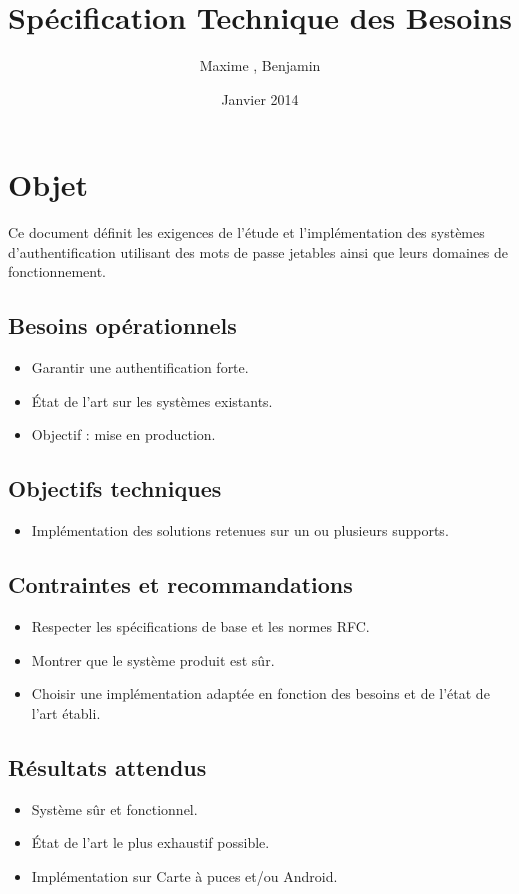 \documentclass{"../../res/univ-projet"}
\title{Spécification Technique des Besoins}
\author{Maxime \bsc{Michotte}, Benjamin \bsc{Zigh}}
\date{Janvier 2014}
\begin{document}
\maketitle
\section{Objet}
Ce document définit les exigences de l'étude et l'implémentation des systèmes d'authentification 
utilisant des mots de passe jetables ainsi que leurs domaines de fonctionnement.

    \subsection{Besoins opérationnels} 
        \begin{itemize}
            \item Garantir une authentification forte.
            \item État de l'art sur les systèmes existants.
            \item Objectif : mise en production.
        \end{itemize}
    \subsection{Objectifs techniques}
    \begin{itemize}	
            \item Implémentation des solutions retenues sur un ou plusieurs supports.
    \end{itemize}
    \subsection{Contraintes et recommandations} 
        \begin{itemize}
            \item Respecter les spécifications de base et les normes RFC.
            \item Montrer que le système produit est sûr.
            \item Choisir une implémentation adaptée en fonction des besoins et de l'état de l'art établi.
        \end{itemize}
    \subsection{Résultats attendus} 
        \begin{itemize}
            \item Système sûr et fonctionnel.
            \item État de l'art le plus exhaustif possible.
            \item Implémentation sur Carte à puces et/ou Android.
        \end{itemize}
        
\end{document}
